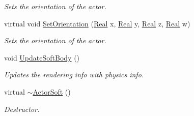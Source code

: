 \begin{DoxyCompactItemize}
\begin{DoxyCompactList}\small\item\em Sets the orientation of the actor. \item\end{DoxyCompactList}\item 
virtual void \hyperlink{classphys_1_1ActorSoft_a84541e8ebf7b54c91d2353d5f84381bb}{SetOrientation} (\hyperlink{namespacephys_af7eb897198d265b8e868f45240230d5f}{Real} x, \hyperlink{namespacephys_af7eb897198d265b8e868f45240230d5f}{Real} y, \hyperlink{namespacephys_af7eb897198d265b8e868f45240230d5f}{Real} z, \hyperlink{namespacephys_af7eb897198d265b8e868f45240230d5f}{Real} w)
\begin{DoxyCompactList}\small\item\em Sets the orientation of the actor. \item\end{DoxyCompactList}\item 
void \hyperlink{classphys_1_1ActorSoft_a330e7bacd6250a2a24479561a84ea073}{UpdateSoftBody} ()
\begin{DoxyCompactList}\small\item\em Updates the rendering info with physics info. \item\end{DoxyCompactList}\item 
virtual \hyperlink{classphys_1_1ActorSoft_a636c145f1e468fd45adc8da2a1708fbe}{$\sim$ActorSoft} ()
\begin{DoxyCompactList}\small\item\em Destructor. \item\end{DoxyCompactList}\end{DoxyCompactItemize}
